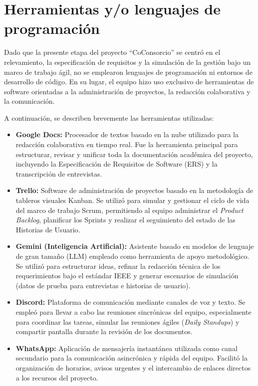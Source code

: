 \section{Herramientas y/o lenguajes de programación}

Dado que la presente etapa del proyecto ``CoConsorcio'' se centró en el relevamiento, la especificación de requisitos y la simulación de la gestión bajo un marco de trabajo ágil, no se emplearon lenguajes de programación ni entornos de desarrollo de código. En su lugar, el equipo hizo uso exclusivo de herramientas de software orientadas a la administración de proyectos, la redacción colaborativa y la comunicación.  

A continuación, se describen brevemente las herramientas utilizadas:

\begin{itemize}
    \item \textbf{Google Docs:} Procesador de textos basado en la nube utilizado para la redacción colaborativa en tiempo real. Fue la herramienta principal para estructurar, revisar y unificar toda la documentación académica del proyecto, incluyendo la Especificación de Requisitos de Software (ERS) y la transcripción de entrevistas.  
    \item \textbf{Trello:} Software de administración de proyectos basado en la metodología de tableros visuales Kanban. Se utilizó para simular y gestionar el ciclo de vida del marco de trabajo Scrum, permitiendo al equipo administrar el \textit{Product Backlog}, planificar los Sprints y realizar el seguimiento del estado de las Historias de Usuario.  
    \item \textbf{Gemini (Inteligencia Artificial):} Asistente basado en modelos de lenguaje de gran tamaño (LLM) empleado como herramienta de apoyo metodológico. Se utilizó para estructurar ideas, refinar la redacción técnica de los requerimientos bajo el estándar IEEE y generar escenarios de simulación (datos de prueba para entrevistas e historias de usuario).  
    \item \textbf{Discord:} Plataforma de comunicación mediante canales de voz y texto. Se empleó para llevar a cabo las reuniones sincrónicas del equipo, especialmente para coordinar las tareas, simular las reuniones ágiles (\textit{Daily Standups}) y compartir pantalla durante la revisión de los documentos.  
    \item \textbf{WhatsApp:} Aplicación de mensajería instantánea utilizada como canal secundario para la comunicación asincrónica y rápida del equipo. Facilitó la organización de horarios, avisos urgentes y el intercambio de enlaces directos a los recursos del proyecto.  
\end{itemize}
